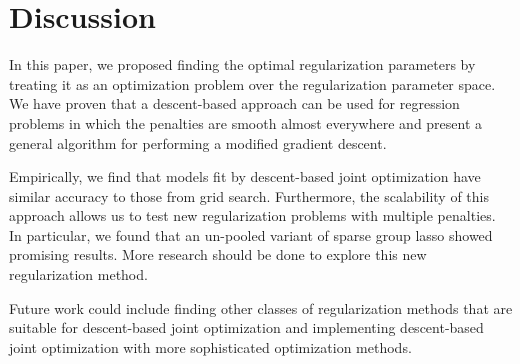 \documentclass[12pt,letterpaper]{article}
\begin{document}
\section{Discussion}
In this paper, we proposed finding the optimal regularization parameters by treating it as an optimization problem over the regularization parameter space. We have proven that a descent-based approach can be used for regression problems in which the penalties are smooth almost everywhere and present a general algorithm for performing a modified gradient descent.

Empirically, we find that models fit by descent-based joint optimization have similar accuracy to those from grid search. Furthermore, the scalability of this approach allows us to test new regularization problems with multiple penalties. In particular, we found that an un-pooled variant of sparse group lasso showed promising results. More research should be done to explore this new regularization method.

Future work could include finding other classes of regularization methods that are suitable for descent-based joint optimization and implementing descent-based joint optimization with more sophisticated optimization methods.

\bigskip



\end{document}
